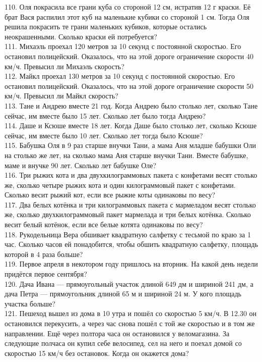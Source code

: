 \documentclass[12pt]{article}
\begin{document}
110. Оля покрасила все грани куба со стороной 12 см, истратив 12 г краски. Её брат Вася распилил этот куб на маленькие кубики со стороной 1 см. Тогда Оля решила покрасить те грани маленьких кубиков, которые остались неокрашенными. Сколько краски ей потребуется?\\
111. Михаэль проехал 120 метров за 10 секунд с постоянной скоростью. Его остановил полицейский. Оказалось, что на этой дороге ограничение скорости 40 км/ч. Превысил ли Михаэль скорость?\\
112. Майкл проехал 130 метров за 10 секунд с постоянной скоростью. Его остановил полицейский. Оказалось, что на этой дороге ограничение скорости 50 км/ч. Превысил ли Майкл скорость?\\
113. Тане и Андрею вместе 21 год. Когда Андрею было столько лет, сколько Тане сейчас, им вместе было 15 лет. Сколько лет было тогда Андрею?\\
114. Даше и Ксюше вместе 18 лет. Когда Даше было столько лет, сколько Ксюше сейчас, им вместе было 10 лет. Сколько лет тогда было Ксюше?\\
115. Бабушка Оля в 9 раз старше внучки Тани, а мама Аня младше бабушки Оли на столько же лет, на сколько мама Аня старше внучки Тани. Вместе бабушке, маме и внучке 90 лет. Сколько лет бабушке Оле?\\
116. Три рыжих кота и два двухкилограммовых пакета с конфетами весят столько же, сколько четыре рыжих кота и один килограммовый пакет с конфетами. Сколько весит рыжий кот, если все рыжие коты одинаковы по весу?\\
117. Два белых котёнка и три килограммовых пакета с мармеладом весят столько же, сколько двухкилограммовый пакет мармелада и три белых котёнка. Сколько весит белый котёнок, если все белые котята одинаковы по весу?\\
118. Рукодельница Вера обшивает квадратную салфетку с тесьмой по краю за 1 час. Сколько часов ей понадобится, чтобы обшить квадратную салфетку, площадь которой в 4 раза больше?\\
119. Первое апреля в некотором году пришлось на вторник. На какой день недели придётся первое сентября?\\
120. Дача Ивана --- прямоугольный участок длиной 649 дм и шириной 241 дм, а дача Петра --- прямоугольник длиной 65 м и шириной 24 м. У кого площадь участка больше?\\
121. Пешеход вышел из дома в 10 утра и пошёл со скоростью 5 км/ч. В 12.30 он остановился перекусить, а через час снова пошёл с той же скоростью и в том же направлении. Ещё через полтора часа он остановился у веломагазина. За следующие полчаса он купил себе велосипед, сел на него и поехал домой со скоростью 15 км/ч без остановок. Когда он окажется дома?\\
\end{document}
